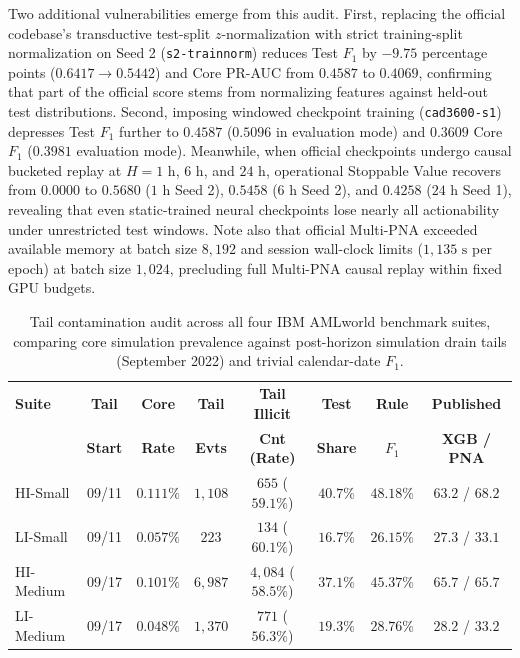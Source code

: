 \documentclass[pdflatex,sn-mathphys,Numbered]{sn-jnl}
\theoremstyle{thmstyleone}
\begin{document}
Two additional vulnerabilities emerge from this audit. First, replacing the official codebase's transductive test-split $z$-normalization with strict training-split normalization on Seed 2 (\texttt{s2-trainnorm}) reduces Test $F_1$ by $-9.75$ percentage points ($0.6417 \to 0.5442$) and Core PR-AUC from $0.4587$ to $0.4069$, confirming that part of the official score stems from normalizing features against held-out test distributions. Second, imposing windowed checkpoint training (\texttt{cad3600-s1}) depresses Test $F_1$ further to $0.4587$ ($0.5096$ in evaluation mode) and $0.3609$ Core $F_1$ ($0.3981$ evaluation mode). Meanwhile, when official checkpoints undergo causal bucketed replay at $H = 1\text{ h}$, $6\text{ h}$, and $24\text{ h}$, operational Stoppable Value recovers from $0.0000$ to $0.5680$ ($1\text{ h}$ Seed 2), $0.5458$ ($6\text{ h}$ Seed 2), and $0.4258$ ($24\text{ h}$ Seed 1), revealing that even static-trained neural checkpoints lose nearly all actionability under unrestricted test windows. Note also that official Multi-PNA exceeded available memory at batch size $8{,}192$ and session wall-clock limits ($1{,}135\text{ s}$ per epoch) at batch size $1{,}024$, precluding full Multi-PNA causal replay within fixed GPU budgets.

\begin{table}[t]
\centering
\caption{Tail contamination audit across all four IBM AMLworld benchmark suites, comparing core simulation prevalence against post-horizon simulation drain tails (September 2022) and trivial calendar-date $F_1$.}
\label{tab:tail_audit}
\scriptsize
\setlength{\tabcolsep}{2.2pt}
\begin{tabular}{@{}lccccccc@{}}
\toprule
\textbf{Suite} & \textbf{Tail} & \textbf{Core} & \textbf{Tail} & \textbf{Tail Illicit} & \textbf{Test} & \textbf{Rule} & \textbf{Published} \\
 & \textbf{Start} & \textbf{Rate} & \textbf{Evts} & \textbf{Cnt (Rate)} & \textbf{Share} & \textbf{$F_1$} & \textbf{XGB / PNA} \\
\midrule
HI-Small & 09/11 & $0.111\%$ & $1{,}108$ & $655$ ($59.1\%$) & $40.7\%$ & $48.18\%$ & $63.2$ / $68.2$ \\
LI-Small & 09/11 & $0.057\%$ & $223$ & $134$ ($60.1\%$) & $16.7\%$ & $26.15\%$ & $27.3$ / $33.1$ \\
HI-Medium & 09/17 & $0.101\%$ & $6{,}987$ & $4{,}084$ ($58.5\%$) & $37.1\%$ & $45.37\%$ & $65.7$ / $65.7$ \\
LI-Medium & 09/17 & $0.048\%$ & $1{,}370$ & $771$ ($56.3\%$) & $19.3\%$ & $28.76\%$ & $28.2$ / $33.2$ \\
\bottomrule
\end{tabular}
\end{table}
\end{document}
